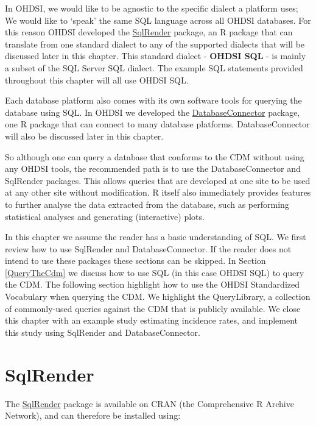 \documentclass[11pt]{book}
\begin{document}
In OHDSI, we would like to be agnostic to the specific dialect a
platform uses; We would like to `speak' the same SQL language across all
OHDSI databases. For this reason OHDSI developed the
\href{https://ohdsi.github.io/SqlRender/}{SqlRender} package, an R
package that can translate from one standard dialect to any of the
supported dialects that will be discussed later in this chapter. This
standard dialect - \textbf{OHDSI SQL} - is mainly a subset of the SQL
Server SQL dialect. The example SQL statements provided throughout this
chapter will all use OHDSI SQL.

Each database platform also comes with its own software tools for
querying the database using SQL. In OHDSI we developed the
\href{https://ohdsi.github.io/DatabaseConnector/}{DatabaseConnector}
package, one R package that can connect to many database platforms.
DatabaseConnector will also be discussed later in this chapter.

So although one can query a database that conforms to the CDM without
using any OHDSI tools, the recommended path is to use the
DatabaseConnector and SqlRender packages. This allows queries that are
developed at one site to be used at any other site without modification.
R itself also immediately provides features to further analyse the data
extracted from the database, such as performing statistical analyses and
generating (interactive) plots.

In this chapter we assume the reader has a basic understanding of SQL.
We first review how to use SqlRender and DatabaseConnector. If the
reader does not intend to use these packages these sections can be
skipped. In Section \ref{QueryTheCdm} we discuss how to use SQL (in this
case OHDSI SQL) to query the CDM. The following section highlight how to
use the OHDSI Standardized Vocabulary when querying the CDM. We
highlight the QueryLibrary, a collection of commonly-used queries
against the CDM that is publicly available. We close this chapter with
an example study estimating incidence rates, and implement this study
using SqlRender and DatabaseConnector.

\section{SqlRender}\label{SqlRender}

The \href{https://ohdsi.github.io/SqlRender/}{SqlRender} package is
available on CRAN (the Comprehensive R Archive Network), and can
therefore be installed using:
\end{document}
